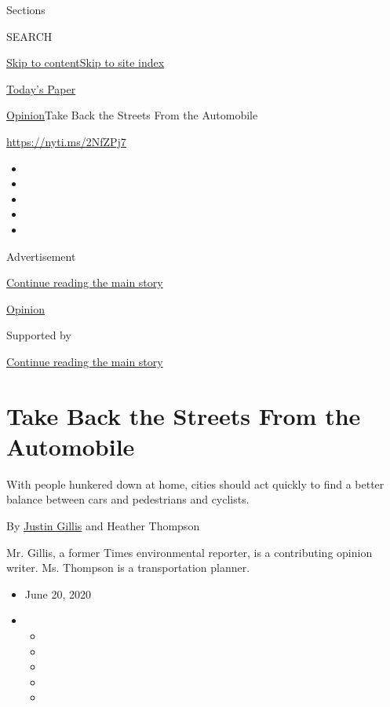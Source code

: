 Sections

SEARCH

\protect\hyperlink{site-content}{Skip to
content}\protect\hyperlink{site-index}{Skip to site index}

\href{https://myaccount.nytimes3xbfgragh.onion/auth/login?response_type=cookie\&client_id=vi}{}

\href{https://www.nytimes3xbfgragh.onion/section/todayspaper}{Today's
Paper}

\href{/section/opinion}{Opinion}\textbar{}Take Back the Streets From the
Automobile

\url{https://nyti.ms/2NfZPj7}

\begin{itemize}
\item
\item
\item
\item
\item
\end{itemize}

Advertisement

\protect\hyperlink{after-top}{Continue reading the main story}

\href{/section/opinion}{Opinion}

Supported by

\protect\hyperlink{after-sponsor}{Continue reading the main story}

\hypertarget{take-back-the-streets-from-the-automobile}{%
\section{Take Back the Streets From the
Automobile}\label{take-back-the-streets-from-the-automobile}}

With people hunkered down at home, cities should act quickly to find a
better balance between cars and pedestrians and cyclists.

By \href{https://www.nytimes3xbfgragh.onion/by/justin-gillis}{Justin
Gillis} and Heather Thompson

Mr. Gillis, a former Times environmental reporter, is a contributing
opinion writer. Ms. Thompson is a transportation planner.

\begin{itemize}
\item
  June 20, 2020
\item
  \begin{itemize}
  \item
  \item
  \item
  \item
  \item
  \end{itemize}
\end{itemize}

